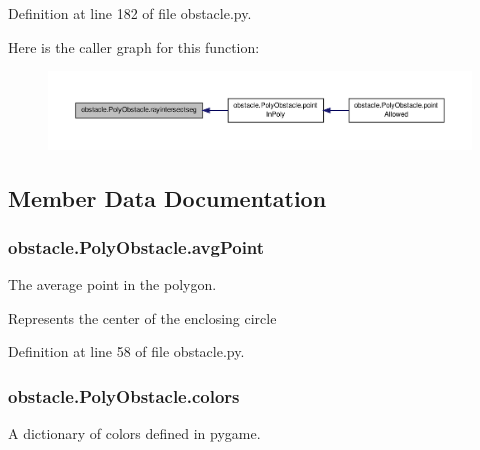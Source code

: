 Definition at line 182 of file obstacle.\-py.



Here is the caller graph for this function\-:
\nopagebreak
\begin{figure}[H]
\begin{center}
\leavevmode
\includegraphics[width=350pt]{classobstacle_1_1PolyObstacle_a646f5fc4ba3e67c98c2313f4493b6a08_icgraph}
\end{center}
\end{figure}




\subsection{Member Data Documentation}
\hypertarget{classobstacle_1_1PolyObstacle_ae426e9296754e1ba96abcee3b86b3591}{
\subsubsection[{avg\-Point}]{\setlength{\rightskip}{0pt plus 5cm}obstacle.\-Poly\-Obstacle.\-avg\-Point}}\label{classobstacle_1_1PolyObstacle_ae426e9296754e1ba96abcee3b86b3591}


The average point in the polygon. 

Represents the center of the enclosing circle 

Definition at line 58 of file obstacle.\-py.

\hypertarget{classobstacle_1_1PolyObstacle_a73ce2986866adb38653645c5b84ec0ce}{
\subsubsection[{colors}]{\setlength{\rightskip}{0pt plus 5cm}obstacle.\-Poly\-Obstacle.\-colors}}\label{classobstacle_1_1PolyObstacle_a73ce2986866adb38653645c5b84ec0ce}


A dictionary of colors defined in pygame. 



